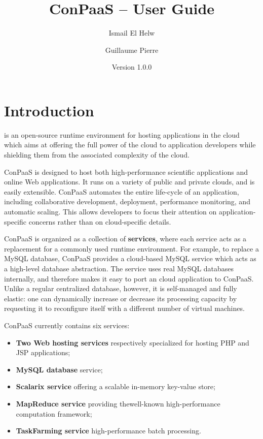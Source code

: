 \documentclass[10pt]{article}
\title{ConPaaS -- User Guide\htmlonly{ [\xml{a href="userguide.pdf"}pdf\xml{/a}]}}
\author{Ismail El Helw \and Guillaume Pierre}
\date{Version 1.0.0}
\begin{document}
\maketitle

\T\vfil
\T\tableofcontents
\T\vfil
\T\newpage

\section{Introduction}

 is an open-source runtime
environment for hosting applications in the cloud which aims at
offering the full power of the cloud to application developers while
shielding them from the associated complexity of the cloud.

ConPaaS is designed to host both high-performance scientific
applications and online Web applications. It runs on a variety of
public and private clouds, and is easily extensible.  ConPaaS
automates the entire life-cycle of an application, including
collaborative development, deployment, performance monitoring, and
automatic scaling. This allows developers to focus their attention on
application-specific concerns rather than on cloud-specific details.

ConPaaS is organized as a collection of \textbf{services}, where each
service acts as a replacement for a commonly used runtime environment.
For example, to replace a MySQL database, ConPaaS provides a
cloud-based MySQL service which acts as a high-level database
abstraction. The service uses real MySQL databases internally, and
therefore makes it easy to port an cloud application to ConPaaS.
Unlike a regular centralized database, however, it is self-managed and
fully elastic: one can dynamically increase or decrease its processing
capacity by requesting it to reconfigure itself with a different
number of virtual machines.

ConPaaS currently contains six services: 

\begin{itemize}
\item \textbf{Two Web hosting services} respectively specialized for
  hosting PHP and JSP applications;
\item \textbf{MySQL database} service;
\item \textbf{Scalarix service} offering a scalable in-memory
  key-value store;
\item \textbf{MapReduce service} providing thewell-known
  high-performance computation framework;
\item \textbf{TaskFarming service} high-performance batch processing.
\end{itemize}
\end{document}
